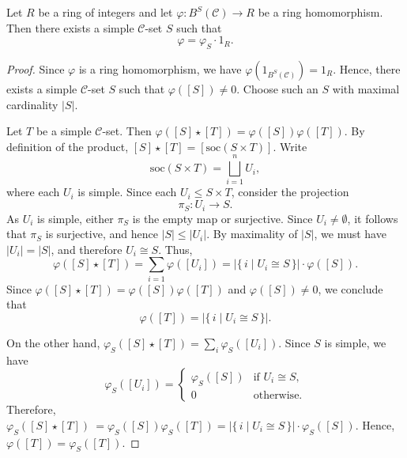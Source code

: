 \documentclass[10pt,a4paper]{amsart}
\newcommand*{\cat}[1]{\mathcal{#1}}
\begin{document}
\begin{thm}\label{funtion and marcks}
Let $R$ be a ring of integers and let   $\varphi \colon B^S(\cat{C}) \to R$  be a ring homomorphism. Then there exists a simple $\cat{C}$-set $S$ such that
\[
    \varphi = \varphi_S\cdot 1_R.
\]
\end{thm}

\begin{proof}
    Since $\varphi$ is a ring homomorphism, we have $\varphi(1_{B^S(\cat{C})})=1_R$. Hence, there exists a simple $\cat{C}$-set $S$ such that $\varphi([S])\neq 0$. Choose such an $S$ with maximal cardinality $|S|$.

Let $T$ be a simple $\cat{C}$-set. Then $\varphi([S] \star [T]) = \varphi([S])\varphi([T]).
 $
By definition of the product, $[S] \star [T] = [\mathrm{soc}(S \times T)]. $ Write
\[
\mathrm{soc}(S \times T) = \bigsqcup_{i=1}^n U_i,
\]
where each $U_i$ is simple. Since each $U_i \leq S \times T$, consider the projection
\[
\pi_S \colon U_i \longrightarrow S.
\]
As $U_i$ is simple, either $\pi_S$ is the empty map or surjective. Since $U_i \neq \emptyset$, it follows that $\pi_S$ is surjective, and hence $ |S| \leq |U_i|.
$
By maximality of $|S|$, we must have $|U_i| = |S|$, and therefore $U_i \cong S.$ Thus,
\[
\varphi([S] \star [T]) = \sum_{i=1} \varphi([U_i])
= |\{\, i \mid U_i \cong S \,\} |\cdot \varphi([S]).
\]
Since $\varphi([S] \star [T])=\varphi([S])\varphi([T])$ and $\varphi([S])\neq 0$, we conclude that
\[
\varphi([T]) = |\{\, i \mid U_i \cong S \,\}|.
\]

On the other hand, $\varphi_S([S] \star [T]) = \sum_i \varphi_S([U_i]).
 $
Since $S$ is simple, we have
\[
\varphi_S([U_i]) =
\begin{cases}
\varphi_S([S]) & \text{if } U_i \cong S,\\
0 & \text{otherwise}.
\end{cases}
\]
Therefore, $\varphi_S([S] \star [T])\
=  \varphi_S([S])\varphi_S([T])=|\{\, i \mid U_i \cong S \,\} |\cdot \varphi_S([S]). $ Hence, $\varphi([T]) = \varphi_S([T]).
$
\end{proof}
\end{document}
